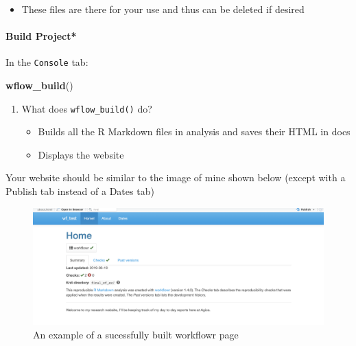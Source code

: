 \documentclass[openany]{article}
\newenvironment{Shaded}{\begin{snugshade}}{\end{snugshade}}
\newcommand{\KeywordTok}[1]{\textcolor[rgb]{0.13,0.29,0.53}{\textbf{#1}}}
\newcommand{\NormalTok}[1]{#1}
\providecommand{\tightlist}{%
  \setlength{\itemsep}{0pt}\setlength{\parskip}{0pt}}
\let\oldparagraph\paragraph
\renewcommand{\paragraph}[1]{\oldparagraph{#1}\mbox{}}
\begin{document}
\begin{enumerate}
  \begin{itemize}
  \tightlist
  \item
    These files are there for your use and thus can be deleted if desired
  \end{itemize}
\end{enumerate}

\hypertarget{build-project}{%
\paragraph{Build Project*}\label{build-project}}

In the \texttt{Console} tab:

\begin{Shaded}
\begin{Highlighting}[]
\KeywordTok{wflow_build}\NormalTok{()}
\end{Highlighting}
\end{Shaded}

\begin{enumerate}
\def\labelenumi{\arabic{enumi}.}
\tightlist
\item
  What does \texttt{wflow\_build()} do?

  \begin{itemize}
  \tightlist
  \item
    Builds all the R Markdown files in analysis and saves their HTML in docs
  \item
    Displays the website
  \end{itemize}
\end{enumerate}

Your website should be similar to the image of mine shown below (except with a Publish tab instead of a Dates tab)

\begin{figure}

{\centering \includegraphics[width=0.9\linewidth]{images/Workflow_Photos/sample_wf} 

}

\caption{An example of a sucessfully built workflowr page}\label{fig:c4}
\end{figure}
\end{document}
